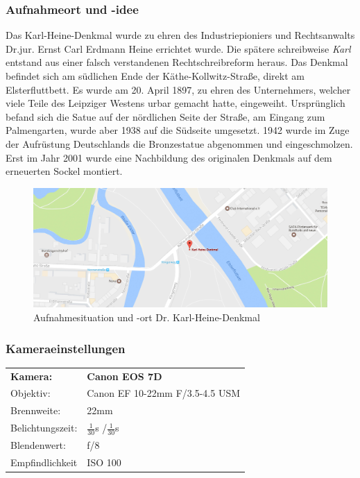 \documentclass[liststotoc,bibtotoc,fontsize=14pt,]{scrreprt}
\begin{document}
\subsubsection{Aufnahmeort und -idee}
Das Karl-Heine-Denkmal wurde zu ehren des Industriepioniers und Rechtsanwalts Dr.jur. Ernst Carl Erdmann Heine errichtet wurde. Die spätere schreibweise \textit{Karl} entstand aus einer falsch verstandenen Rechtschreibreform heraus. Das Denkmal befindet sich am südlichen Ende der Käthe-Kollwitz-Straße, direkt am Elsterfluttbett. Es wurde am 20. April 1897, zu ehren des Unternehmers, welcher viele Teile des Leipziger Westens urbar gemacht hatte, eingeweiht. Ursprünglich befand sich die Satue auf der nördlichen Seite der Straße, am Eingang zum Palmengarten, wurde aber 1938 auf die Südseite umgesetzt. 1942 wurde im Zuge der Aufrüstung Deutschlands die Bronzestatue abgenommen und eingeschmolzen. Erst im Jahr 2001 wurde eine Nachbildung des originalen Denkmals auf dem erneuerten Sockel montiert. 

		\begin{figure}[H]
			\includegraphics[width=\linewidth]{img/places/kh.jpg}
			\caption{Aufnahmesituation und -ort Dr. Karl-Heine-Denkmal}
			\label{img:kh}
		\end{figure}
		
		\subsubsection{Kameraeinstellungen}
		\begin{tabular}{ll}
			\textbf{Kamera:} &\textbf{Canon EOS 7D} \\
			Objektiv: &Canon EF 10-22mm F/3.5-4.5 USM\\		
			Brennweite:& 22mm \\
			Belichtungszeit: & $\frac{1}{30}$s /$\frac{1}{30}$s\\
			Blendenwert: & f/8\\
			Empfindlichkeit & ISO 100 \\
		\end{tabular}\\
		
\end{document}
